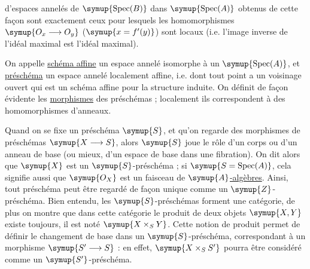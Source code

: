 d'espaces annelés de $\symup{\operatorname{Spec}(B)}$ dans
$\symup{\operatorname{Spec}(A)}$ obtenus de cette façon sont exactement ceux pour
lesquels les homomorphismes $\symup{O_x\longrightarrow O_y}$ ($\symup{x=f'(y)}$) sont
locaux (i.e. l'image inverse de l'idéal maximal est l'idéal maximal).

On appelle \uline{schéma affine} un espace annelé isomorphe à un
$\symup{\operatorname{Spec}(A)}$, et \uline{préschéma} un espace annelé localement
affine, i.e. dont tout point a un voisinage ouvert qui est un schéma affine pour
la structure induite. On définit de façon évidente les \uline{morphismes} des
préschémas ; localement ils correspondent à des homomorphismes d'anneaux.

Quand on se fixe un préschéma $\symup{S}$, et qu'on regarde des morphismes de préschémas
$\symup{X\longrightarrow S}$, alors $\symup{S}$ joue le rôle d'un corps ou d'un anneau de base
(ou mieux, d'un espace de base dans une fibration). On dit alors que $\symup{X}$ est un
$\symup{S}$-préschéma ; si $\symup{S=\operatorname{Spec}(A)}$, cela signifie aussi que $\symup{O_X}$
est un faisceau de $\symup{A}$\uline{-algèbres}. Ainsi, tout préschéma peut être regardé de
façon unique comme un $\symup{Z}$-préschéma. Bien entendu, les $\symup{S}$-préschémas
forment une catégorie, de plus on montre que dans cette catégorie le produit
de deux objets $\symup{X,Y}$ existe toujours, il est noté $\symup{X\times_S Y}$. Cette notion
de produit permet de définir le changement de base dans un $\symup{S}$-préschéma,
correspondant à un morphisme $\symup{S'\longrightarrow S}$ : en effet,
$\symup{X\times_S S'}$ pourra être considéré comme un $\symup{S'}$-préschéma.

